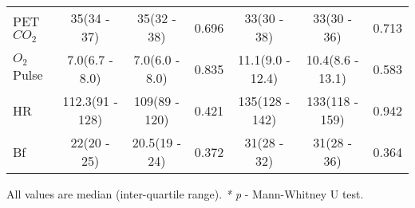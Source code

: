 \begin{sidewaystable}[p]
\begin{tabular}{|l | c c c | c c c|}
		PET$CO_2$                    & 35(34 - 37)       & 35(32 - 38)       & 0.696 & 33(30 - 38)       & 33(30 - 36)       & 0.713 \\
		$O_2$Pulse                   & 7.0(6.7 - 8.0)    & 7.0(6.0 - 8.0)    & 0.835 & 11.1(9.0 - 12.4)  & 10.4(8.6 - 13.1)  & 0.583 \\
		HR                           & 112.3(91 - 128)   & 109(89 - 120)     & 0.421 & 135(128 - 142)    & 133(118 - 159)    & 0.942 \\
		Bf                           & 22(20 - 25)       & 20.5(19 - 24)     & 0.372 & 31(28 - 32)       & 31(28 - 36)       & 0.364 \\ \hline
	\end{tabular}
		
	All values are median (inter-quartile range). \textit{* p} - Mann-Whitney U test.
\end{sidewaystable}